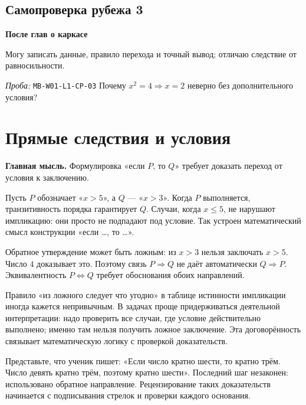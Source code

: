 \documentclass[11pt,a4paper,openany]{book}
\newcommand{\mtag}[1]{\textsf{\small\color{mbaccent}\bfseries #1}}
\newcommand{\muid}[1]{\texttt{\footnotesize #1}}
\begin{document}
\subsection*{Самопроверка рубежа 3}\mtag{После глав о каркасе}\par Могу записать данные, правило перехода и точный вывод; отличаю следствие от равносильности.\par \textit{Проба:} \muid{MB-W01-L1-CP-03} Почему $x^2=4\Rightarrow x=2$ неверно без дополнительного условия?

\medskip

\section{Прямые следствия и условия}\label{theory:8}

\begin{keybox}\textbf{Главная мысль.} Формулировка «если $P$, то $Q$» требует доказать переход от условия к заключению.\end{keybox}

Пусть $P$ обозначает «$x>5$», а $Q$ — «$x>3$». Когда $P$ выполняется, транзитивность порядка гарантирует $Q$. Случаи, когда $x\le5$, не нарушают импликацию: они просто не подпадают под условие. Так устроен математический смысл конструкции «если …, то …».


Обратное утверждение может быть ложным: из $x>3$ нельзя заключать $x>5$. Число $4$ доказывает это. Поэтому связь $P\Rightarrow Q$ не даёт автоматически $Q\Rightarrow P$. Эквивалентность $P\Leftrightarrow Q$ требует обоснования обоих направлений.


Правило «из ложного следует что угодно» в таблице истинности импликации иногда кажется непривычным. В задачах проще придерживаться деятельной интерпретации: надо проверить все случаи, где условие действительно выполнено; именно там нельзя получить ложное заключение. Эта договорённость связывает математическую логику с проверкой доказательств.


Представьте, что ученик пишет: «Если число кратно шести, то кратно трём. Число девять кратно трём, поэтому кратно шести». Последний шаг незаконен: использовано обратное направление. Рецензирование таких доказательств начинается с подписывания стрелок и проверки каждого основания.


\begin{center}
\end{center}
\end{document}
